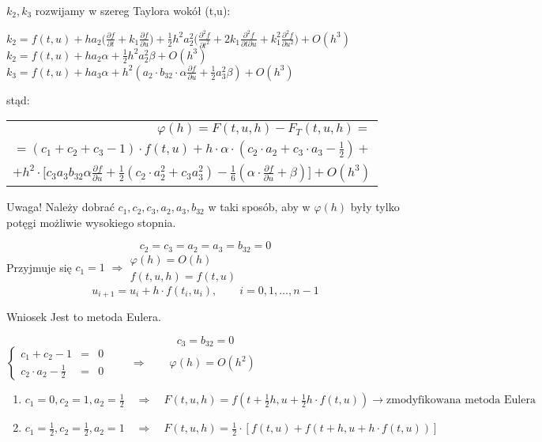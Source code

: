 \begin{frame}
	$k_2, k_3$ rozwijamy w szereg Taylora wokół (t,u):
    \begin{flushleft}
    	$k_2=f(t,u)+ha_2\bigg(\frac{\partial f}{\partial t}+k_1\frac{\partial f}{\partial u}\bigg) + \frac{1}{2}h^2a_2^2\bigg(\frac{\partial^2f}{\partial t^2}+2k_1\frac{\partial^2f}{\partial t \partial u}+k_1^2\frac{\partial^2f}{\partial u^2}\bigg)+O(h^3)$ \newline
        $k_2 = f(t,u)+ha_2\alpha+\frac{1}{2}h^2a_2^2\beta+O(h^3)$ \newline
        $k_3 = f(t,u)+ha_3\alpha + h^2(a_2 \cdot b_{32} \cdot \alpha \frac{\partial f}{\partial u} + \frac{1}{2}a_3^2\beta) + O(h^3)$
    \end{flushleft}
    stąd:
    \begin{tabular}{r}
    	$\varphi(h) = F(t,u,h) - F_T(t,u,h) = $\\
    	$ = (c_1+c_2+c_3-1) \cdot f(t,u)+h \cdot \alpha \cdot (c_2 \cdot a_2 + c_3 \cdot a_3 - \frac{1}{2}) + $ \\
        $+ h^2 \cdot \big[c_3a_3b_{32}\alpha\frac{\partial f}{\partial u}+\frac{1}{2}(c_2 \cdot a_2^2 +c_3a_3^2)-\frac{1}{6}(\alpha \cdot \frac{\partial f}{\partial u}+\beta)\big]+O(h^3) $
    \end{tabular}
    \begin{block}{Uwaga!}
    	Należy dobrać $c_1, c_2, c_3, a_2, a_3, b_{32}$ w taki sposób, aby w $\varphi(h)$ były tylko potęgi możliwie wysokiego stopnia.
    \end{block}
\end{frame}
\begin{frame}
    $$c_2=c_3=a_2=a_3=b_{32}=0$$
    Przyjmuje się $c_1 = 1$ \qquad $\Rightarrow \left.\begin{array}{l}
    \varphi(h) = O(h) \\
    f(t,u,h) = f(t,u)
    \end{array}\right.$
    $$u_{i+1} = u_i + h \cdot f(t_i,u_i), \qquad i = 0,1, \ldots,n-1$$
    \begin{block}{Wniosek}
    	Jest to metoda Eulera.
    \end{block}
\end{frame}
\begin{frame}
    $$c_3 = b_{32} = 0$$
    $\left\{\begin{array}{rcl}
    	c_1 + c_2 - 1 & = & 0\\
        c_2 \cdot a_2 - \frac{1}{2} & = & 0
    \end{array}\right. \qquad\Rightarrow \qquad \varphi(h) = O(h^2)$
    \begin{enumerate}
      \item $c_1 = 0, c_2 = 1, a_2 = \frac{1}{2} \quad \Rightarrow \quad F(t,u,h) = f(t+\frac{1}{2}h, u+\frac{1}{2}h \cdot f(t,u)) \rightarrow \text{zmodyfikowana metoda Eulera}$
      \item $c_1 = \frac{1}{2}, c_2 = \frac{1}{2}, a_2 = 1 \quad\Rightarrow\quad F(t,u,h) = \frac{1}{2} \cdot[f(t,u)+f(t+h,u+h \cdot f(t,u))]$
    \end{enumerate}
\end{frame}
